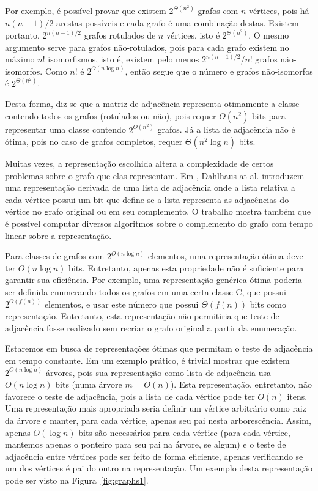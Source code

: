 Por exemplo, é possível provar que existem $2^{\Theta(n^2)}$ grafos com $n$ vértices, pois há $n (n-1)/2$ arestas possíveis e cada grafo é uma combinação destas. Existem portanto, $2^{n (n-1) / 2}$ grafos rotulados de $n$ vértices, isto é $2^{\Theta(n^2)}$. O mesmo argumento serve para grafos não-rotulados, pois para cada grafo existem no máximo $n!$ isomorfismos, isto é, existem pelo menos $2^{n (n-1) / 2} / n!$ grafos não-isomorfos. Como $n!$ é $2^{\Theta(n \log n)}$, então segue que o número e grafos não-isomorfos é $2^{\Theta(n^2)}$.

Desta forma, diz-se que a matriz de adjacência representa otimamente a classe contendo todos os grafos (rotulados ou não), pois requer $O(n^2)$ bits para representar uma classe contendo $2^{\Theta({n^2})}$ grafos. Já a lista de adjacência não é ótima, pois no caso de grafos completos, requer $\Theta(n^2 \log n)$ bits.

Muitas vezes, a representação escolhida altera a complexidade de certos problemas sobre o grafo que elas representam. Em \cite{dahlhaus2002partially}, Dahlhaus at al. introduzem uma representação derivada de uma lista de adjacência onde a lista relativa a cada vértice possui um bit que define se a lista representa as adjacências do vértice no grafo original ou em seu complemento. O trabalho mostra também que é possível computar diversos algoritmos sobre o complemento do grafo com tempo linear sobre a representação.

Para classes de grafos com $2^{O(n\log n)}$ elementos, uma representação ótima deve ter $O(n\log n)$ bits. Entretanto, apenas esta propriedade não é suficiente para garantir sua eficiência. Por exemplo, uma representação genérica ótima poderia ser definida enumerando todos os grafos em uma certa classe C, que possui $2^{\Theta(f(n))}$ elementos, e usar este número que possui $\Theta(f(n))$ bits como representação. Entretanto, esta representação não permitiria que teste de adjacência fosse realizado sem recriar o grafo original a partir da enumeração.

Estaremos em busca de representações ótimas que permitam o teste de adjacência em tempo constante. Em um exemplo prático, é trivial mostrar que existem $2^{O(n\log n)}$ árvores, pois sua representação como lista de adjacência usa $O(n \log n)$ bits (numa árvore $m = O(n)$). Esta representação, entretanto, não favorece o teste de adjacência, pois a lista de cada vértice pode ter $O(n)$ itens. Uma representação mais apropriada seria definir um vértice arbitrário como raiz da árvore e manter, para cada vértice, apenas seu pai nesta arborescência. Assim, apenas $O(\log n)$ bits são necessários para cada vértice (para cada vértice, mantemos apenas o ponteiro para seu pai na árvore, se algum) e o teste de adjacência entre vértices pode ser feito de forma eficiente, apenas verificando se um dos vértices é pai do outro na representação. Um exemplo desta representação pode ser visto na Figura~\ref{fig:graphs1}. 

